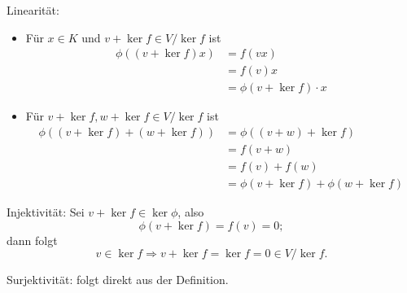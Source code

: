 	Linearität:
		\begin{itemize}
		\item Für $ x\in K $ und $ v+\ker f \in V/\ker f $ ist
		\begin{align*}
		\phi( (v+\ker f)x) &= f(vx)\\
                                   &= f(v)x \\
                                   &= \phi (v+\ker f)\cdot x
		\end{align*}
		\item Für $ v+\ker f, w+\ker f\in V/\ker f $ ist 
			\begin{align*}
			\phi ((v+\ker f)+(w+\ker f) ) &= \phi((v+w)+\ker f) \\
			&=f(v+w)\\
			&= f(v)+f(w)\\
			&=\phi(v+\ker f)+\phi(w+\ker f)
			\end{align*}
		\end{itemize}
	Injektivität:
	Sei $ v+\ker f\in \ker \phi $, also 
		\[ \phi(v+\ker f)= f(v) = 0; \]
	dann folgt
		\[ v\in \ker f \Rightarrow v+\ker f = \ker f = 0\in V/\ker f. \]
	
	Surjektivität:
	folgt direkt aus der Definition.		